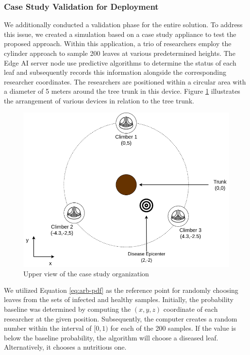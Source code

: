 \subsubsection{Case Study Validation for Deployment}

We additionally conducted a validation phase for the entire solution. To address this issue, we created a simulation based on a case study appliance to test the proposed approach. Within this application, a trio of researchers employ the cylinder approach to sample 200 leaves at various predetermined heights. The Edge AI server node use predictive algorithms to determine the status of each leaf and subsequently records this information alongside the corresponding researcher coordinates. The researchers are positioned within a circular area with a diameter of 5 meters around the tree trunk in this device. Figure \ref{fig:solution-organization} illustrates the arrangement of various devices in relation to the tree trunk.

\begin{figure}[h!]
    \centering
    \includegraphics[width = .7\linewidth]{Figures/case-study-geometry.png}
    \caption{Upper view of the case study organization}
    \label{fig:solution-organization}
\end{figure}

We utilized Equation \ref{eq:arb-pdf} as the reference point for randomly choosing leaves from the sets of infected and healthy samples. Initially, the probability baseline was determined by computing the $(x,y,z)$ coordinate of each researcher at the given position. Subsequently, the computer creates a random number within the interval of $[0,1)$ for each of the 200 samples. If the value is below the baseline probability, the algorithm will choose a diseased leaf. Alternatively, it chooses a nutritious one.

